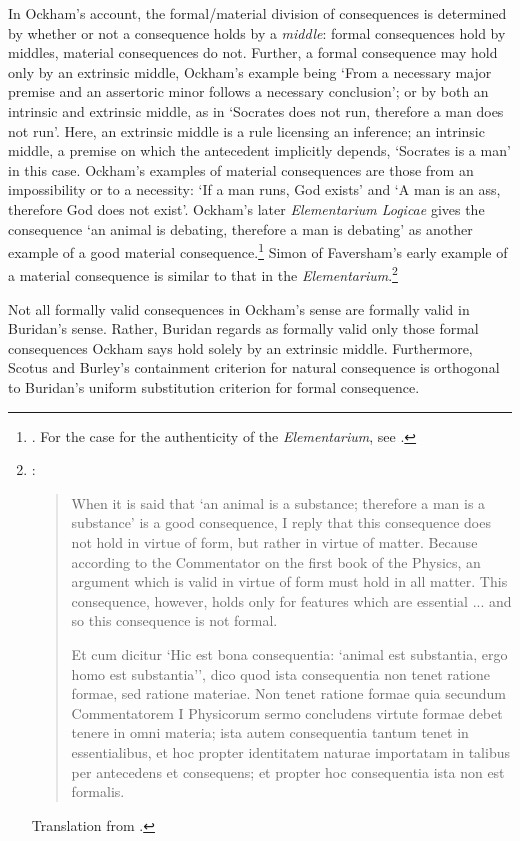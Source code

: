 \documentclass[]{article}
\begin{document}
In Ockham's account, the formal/material division of consequences is determined by whether or not a consequence holds by a \textit{middle}: formal consequences hold by middles, material consequences do not. Further, a formal consequence may hold only by an extrinsic middle, Ockham's example being `From a necessary major premise and an assertoric minor follows a necessary conclusion'; or by both an intrinsic and extrinsic middle, as in `Socrates does not run, therefore a man does not run'. Here, an extrinsic middle is a rule licensing an inference; an intrinsic middle, a premise on which the antecedent implicitly depends, `Socrates is a man' in this case. Ockham's examples of material consequences are those from an impossibility or to a necessity: `If a man runs, God exists' and `A man is an ass, therefore God does not exist'.\autocite[III- 3. 1, p. 589]{OckhamSL} Ockham's later \textit{Elementarium Logicae} gives the consequence `an animal is debating, therefore a man is debating' as another example of a good material consequence.\footnote{\autocite[VI. 4, p. 163]{OckhamEL}. For the case for the authenticity of the \textit{Elementarium}, see \autocite{Boehner1958b}.} Simon of Faversham's early example of a material consequence is similar to that in the \textit{Elementarium}.\footnote{\autocite[q. 36, p. 200]{FavershamQE}: 
\begin{quote}
When it is said that `an animal is a substance; therefore a man is a substance' is a good consequence, I reply that this consequence does not hold in virtue of form, but rather in virtue of matter. Because according to the Commentator on the first book of the Physics, an argument which is valid in virtue of form must hold in all matter. This consequence, however, holds only for features which are essential ... and so this consequence is not formal.

Et cum dicitur `Hic est bona consequentia: `animal est substantia, ergo homo est substantia'', dico quod ista consequentia non tenet ratione formae, sed ratione materiae. Non tenet ratione formae quia secundum Commentatorem I Physicorum sermo concludens virtute formae debet tenere in omni materia; ista autem consequentia tantum tenet in essentialibus, et hoc propter identitatem naturae importatam in talibus per antecedens et consequens; et propter hoc consequentia ista non est formalis.
\end{quote} Translation from \autocite[135]{Martin2004}.}

Not all formally valid consequences in Ockham's sense are formally valid in Buridan's sense. Rather, Buridan regards as formally valid only those formal consequences Ockham says hold solely by an extrinsic middle. Furthermore, Scotus and Burley's containment criterion for natural consequence is orthogonal to Buridan's uniform substitution criterion for formal consequence. 
\end{document}
